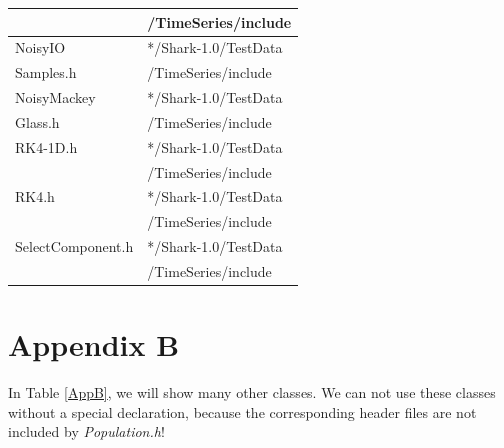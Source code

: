 \documentclass[twocolumn]{article}
\begin{document}
\begin{table}[h]
\begin{center}
{\begin{tabular}{|l|l|}
                           & \hspace{2mm} /TimeSeries/include         \\\hline
NoisyIO                    & */Shark-1.0/TestData                     \\
\hspace*{2mm} Samples.h    & \hspace{2mm} /TimeSeries/include         \\\hline
NoisyMackey                & */Shark-1.0/TestData                     \\
\hspace*{2mm} Glass.h      & \hspace{2mm} /TimeSeries/include         \\\hline
RK4-1D.h                   & */Shark-1.0/TestData                     \\
                           & \hspace{2mm} /TimeSeries/include         \\\hline
RK4.h                      & */Shark-1.0/TestData                     \\
                           & \hspace{2mm} /TimeSeries/include         \\\hline
SelectComponent.h          & */Shark-1.0/TestData                     \\
                           & \hspace{2mm} /TimeSeries/include         \\\hline
\end{tabular}
}
\end{center}
\end{table}

\clearpage

\section*{Appendix B}

\noindent
In Table \ref{AppB}, we will show many other classes. We can not use these
classes without a special declaration,  because the corresponding header
files are not included by {\em Population.h}!

\newpage
\end{document}
